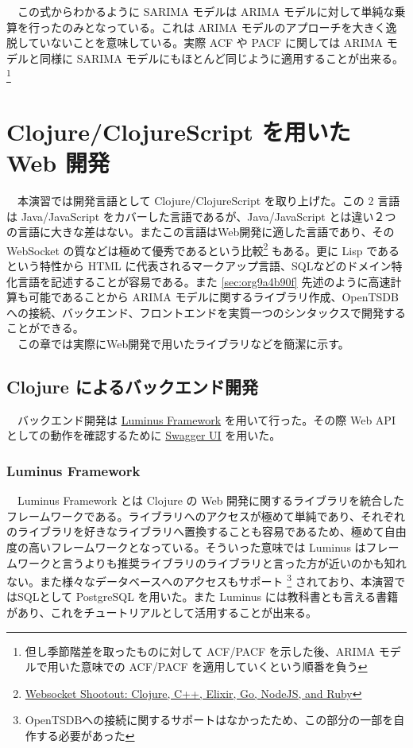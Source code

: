 \documentclass{scrartcl}
\begin{document}
　この式からわかるように SARIMA モデルは ARIMA モデルに対して単純な乗算を行ったのみとなっている。これは ARIMA モデルのアプローチを大きく逸脱していないことを意味している。実際 ACF や PACF に関しては ARIMA モデルと同様に SARIMA モデルにもほとんど同じように適用することが出来る。\footnote{但し季節階差を取ったものに対して ACF/PACF を示した後、ARIMA モデルで用いた意味での ACF/PACF を適用していくという順番を負う}
\section{Clojure/ClojureScript を用いた Web 開発}
\label{sec:org5743b5e}
　本演習では開発言語として Clojure/ClojureScript を取り上げた。この 2 言語は Java/JavaScript をカバーした言語であるが、Java/JavaScript とは違い２つの言語に大きな差はない。またこの言語はWeb開発に適した言語であり、その WebSocket の質などは極めて優秀であるという比較\footnote{\href{https://hashrocket.com/blog/posts/websocket-shootout}{Websocket Shootout: Clojure, C++, Elixir, Go, NodeJS, and Ruby}} もある。更に Lisp であるという特性から HTML に代表されるマークアップ言語、SQLなどのドメイン特化言語を記述することが容易である。また \ref{sec:org9a4b90f} 先述のように高速計算も可能であることから ARIMA モデルに関するライブラリ作成、OpenTSDBへの接続、バックエンド、フロントエンドを実質一つのシンタックスで開発することができる。\\
　この章では実際にWeb開発で用いたライブラリなどを簡潔に示す。\\
\subsection{Clojure によるバックエンド開発}
\label{sec:orgb7533b6}
　バックエンド開発は \href{http://www.luminusweb.net/}{Luminus Framework} を用いて行った。その際 Web API としての動作を確認するために \href{https://swagger.io/swagger-ui/}{Swagger UI} を用いた。\\
\subsubsection{Luminus Framework}
\label{sec:orgdeb0a41}
　Luminus Framework とは Clojure の Web 開発に関するライブラリを統合したフレームワークである。ライブラリへのアクセスが極めて単純であり、それぞれのライブラリを好きなライブラリへ置換することも容易であるため、極めて自由度の高いフレームワークとなっている。そういった意味では Luminus はフレームワークと言うよりも推奨ライブラリのライブラリと言った方が近いのかも知れない。また様々なデータベースへのアクセスもサポート \footnote{OpenTSDBへの接続に関するサポートはなかったため、この部分の一部を自作する必要があった} されており、本演習ではSQLとして PostgreSQL を用いた。また Luminus には教科書とも言える書籍 \cite{luminus} があり、これをチュートリアルとして活用することが出来る。\\
\end{document}
